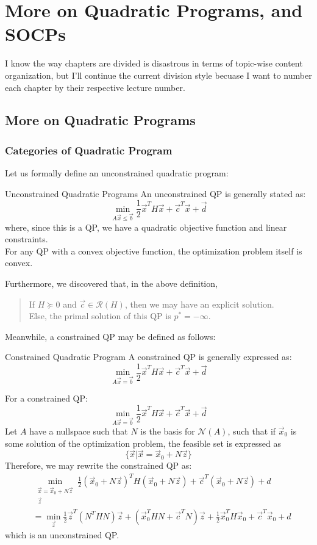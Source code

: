 \chapter{More on Quadratic Programs, and SOCPs}
I know the way chapters are divided is disastrous in terms of topic-wise content organization, but I'll continue the current division style becuase I want to number each chapter by their respective lecture number.

\section{More on Quadratic Programs}
\subsection{Categories of Quadratic Program}
Let us formally define an unconstrained quadratic program:
\begin{ln-define}{Unconstrained Quadratic Programs}{}
    An unconstrained QP is generally stated as:
    \[
        \min_{A \vec{x} \leq \vec{b}} \frac{1}{2} \vec{x}^T H \vec{x} + \vec{c}^T \vec{x} + \vec{d}
    \]
    where, since this is a QP, we have a quadratic objective function and linear constraints. \\
    For any QP with a convex objective function, the optimization problem itself is convex.
\end{ln-define}
Furthermore, we discovered that, in the above definition,
\begin{quote}
    If $H \succcurlyeq 0$ and $\vec{c} \in \mathcal{R}(H)$, then we may have an explicit solution. \\
    Else, the primal solution of this QP is $p^* = -\infty$.
\end{quote}
Meanwhile, a constrained QP may be defined as follows:
\begin{ln-define}{Constrained Quadratic Program}{}
    A constrained QP is generally expressed as:
    \[
        \min_{A \vec{x} = \vec{b}} \frac{1}{2} \vec{x}^T H \vec{x} + \vec{c}^T \vec{x} + \vec{d}
    \]
\end{ln-define}
For a constrained QP:
\[
    \min_{A \vec{x} = \vec{b}} \frac{1}{2} \vec{x}^T H \vec{x} + \vec{c}^T \vec{x} + \vec{d}
\]
Let $A$ have a nullspace such that $N$ is the basis for $\mathcal{N}(A)$, such that if $\vec{x}_0$ is some solution of the optimization problem, the feasible set is expressed as
\[
    \{
        \vec{x} | \vec{x} = \vec{x}_0 + N \vec{z}
    \}
\]
Therefore, we may rewrite the constrained QP as:
\begin{align*}
    &\min_{
        \substack{
            \vec{x} = \vec{x}_0 + N \vec{z} \\
            \vec{z}
        }
    } \frac{1}{2} {(\vec{x}_0 + N \vec{z})}^T H (\vec{x}_0 + N \vec{z}) + \vec{c}^T (\vec{x}_0 + N \vec{z}) + d \\
    &=
    \min_{\vec{z}} \frac{1}{2} \vec{z}^T (N^T H N) \vec{z} + (\vec{x}_0^T H N + \vec{c}^T N) \vec{z} + \frac{1}{2} \vec{x}_0^T H \vec{x}_0 + \vec{c}^T \vec{x}_0 + d
\end{align*}
which is an unconstrained QP.

